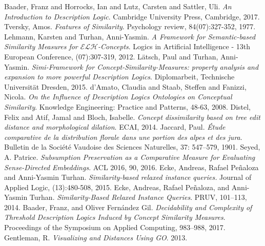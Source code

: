 \documentclass[]{llncs}
\newcommand{\elh}{\(\mathcal{ELH}{}\)}
\begin{document}
  \begin{thebibliography}{1}
      Baader, Franz and Horrocks, Ian and Lutz, Carsten and Sattler, Uli.
      \textit{An Introduction to Description Logic}.
      Cambridge University Press, Cambridge, 2017.
      Tversky, Amos.
      \textit{Features of Similarity}.
      Psychology review, 84(07):327-352, 1977.
      Lehmann, Karsten and Turhan, Anni-Yasmin.
      \textit{A Framework for Semantic-based Similarity Measures for \elh-Concepts}.
      Logics in Artificial Intelligence - 13th European Conference, (07):307-319, 2012.
      Lätsch, Paul and Turhan, Anni-Yasmin.
      \textit{Simi-Framework for Concept-Similarity-Measures: property analysis and expansion to more powerful Description Logics}.
      Diplomarbeit, Technische Universität Dresden, 2015.
      d’Amato, Claudia and Staab, Steffen and Fanizzi, Nicola.
      \textit{On the Influence of Description Logics Ontologies on Conceptual Similarity}.
      Knowledge Engineering: Practice and Patterns, 48-63, 2008.
      Distel, Felix and Atif, Jamal and Bloch, Isabelle.
      \textit{Concept dissimilarity based on tree edit  distance and morphological dilation}.
      ECAI, 2014.
      Jaccard, Paul.
      \textit{\'Etude comparative de la distribution florale dans une portion des alpes et des jura}.
      Bulletin de la Société Vaudoise des Sciences Naturelles, 37: 547–579, 1901.
      Seyed, A. Patrice.
      \textit{Subsumption Preservation as a Comparative Measure for Evaluating Sense-Directed Embeddings}.
      ACL 2016, 90, 2016.
    Ecke, Andreas, Rafael Peñaloza and Anni-Yasmin Turhan.
    \textit{Similarity-based relaxed instance queries.}
    Journal of Applied Logic, (13):480-508, 2015.
    Ecke, Andreas, Rafael Peñaloza, and Anni-Yasmin Turhan.
    \textit{Similarity-Based Relaxed Instance Queries}.
    PRUV, 101–113, 2014.
    Baader, Franz, and Oliver Fernández Gil.
    \textit{Decidability and Complexity of Threshold Description Logics Induced by Concept Similarity Measures}.
    Proceedings of the Symposium on Applied Computing, 983–988, 2017.
    Gentleman, R.
    \textit{Visualizing and Distances Using GO}.
    2013.%
  \end{thebibliography}
\end{document}
